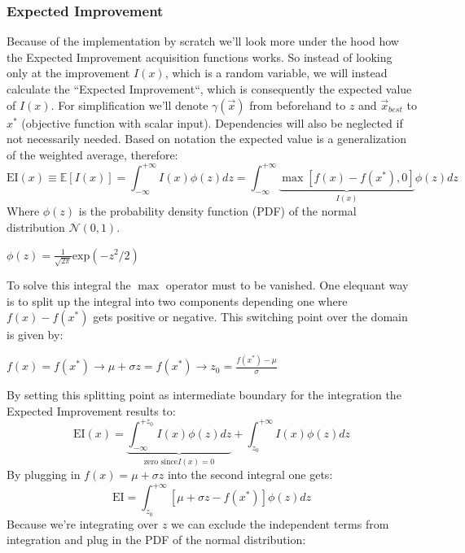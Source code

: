 \documentclass[12pt, a4paper]{article}
\begin{document}
\subsubsection{Expected Improvement}
Because of the implementation by scratch we'll look more under the hood how the Expected Improvement acquisition functions works. So instead of looking only at the improvement $I(x)$, which is a random variable, we will instead calculate the ``Expected Improvement``, which is consequently the expected value of $I(x)$. 
For simplification we'll denote $\gamma(\vec{x})$ from beforehand to $z$ and $\vec{x}_{best}$ to $x^{\ast}$ (objective function with scalar input). Dependencies will also be neglected if not necessarily needed.
Based on notation the expected value is a generalization of the weighted average, therefore:
\begin{equation}
    \text{EI}(x) \equiv \mathbb{E}[I(x)] = \int_{- \infty}^{+ \infty} I(x) \phi(z) dz = 
    \int_{- \infty}^{+ \infty} \underbrace{ {\max}[f(x) - f(x^{\ast}),0] }_{I(x)} \phi(z) dz
\end{equation}
Where $\phi(z)$ is the probability density function (PDF) of the normal distribution $\mathcal{N}(0,1)$.
\begin{center}
    $\phi(z) = \frac{1}{\sqrt{2\pi}} \text{exp}(-z^2/2)$
\end{center}
To solve this integral the $\max$ operator must to be vanished. One elequant way is to split up the integral into two components depending one where $f(x) - f(x^{\ast})$ gets positive or negative. This switching point over the domain is given by:
\begin{center}
    $f(x) = f(x^{\ast}) \rightarrow \mu + \sigma z = f(x^{\ast}) \rightarrow z_0 = \frac{f(x^{\ast}) - \mu}{\sigma}$
\end{center}
By setting this splitting point as intermediate boundary for the integration the Expected Improvement results to:
\begin{equation}
    \text{EI}(x) = \underbrace{\int_{- \infty}^{+ z_0} I(x) \phi(z) dz}_{\text{zero since}  I(x) = 0} + \int_{z_0}^{+ \infty} I(x) \phi(z) dz
\end{equation}
By plugging in $f(x) = \mu + \sigma z$ into the second integral one gets:
\begin{equation}
    \text{EI} = \int_{z_0}^{+ \infty} [\mu + \sigma z - f(x^{\ast})] \phi(z) dz
\end{equation}
Because we're integrating over $z$ we can exclude the independent terms from integration and plug in the PDF of the normal distribution:
\end{document}

